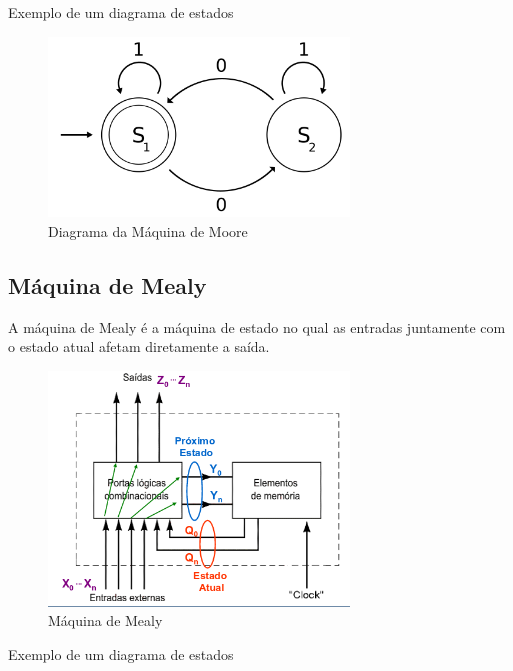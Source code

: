 \documentclass{article}
\begin{document}
            Exemplo de um diagrama de estados
            \newline

            \begin{figure} [H] 
                \includegraphics[width=8cm]{fsm-moore-diagram.png}
                \caption{Diagrama da Máquina de Moore}
                \label{fig:fsm-moore-diagram}
            \end{figure}

        \subsection{Máquina de Mealy}
            A máquina de Mealy é a máquina de estado no qual as entradas juntamente com o estado atual afetam diretamente a saída.

            \begin{figure} [H] 
                \includegraphics[width=8cm]{fsm-mealy.png}
                \caption{Máquina de Mealy}
                \label{fig:fsm-mealy}
            \end{figure}
            
            Exemplo de um diagrama de estados
            \newline
\end{document}
